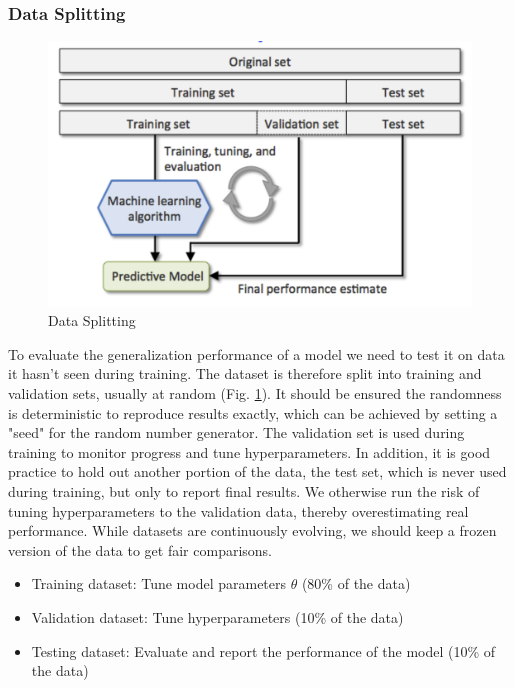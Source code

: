 \subsubsection{Data Splitting}
\begin{figure}[h]
    \includegraphics[width=\linewidth]{chapters/NLP/figures/data_splitting.png}
    \caption{Data Splitting}
    \label{fig:data_splitting}
\end{figure}
To evaluate the generalization performance of a model we need to test it on data it hasn't seen during training.
The dataset is therefore split into training and validation sets, usually at random (Fig. \ref{fig:data_splitting}).
It should be ensured the randomness is deterministic to reproduce results exactly, which can be achieved by setting a "seed" for the random number generator.
The validation set is used during training to monitor progress and tune hyperparameters.
In addition, it is good practice to hold out another portion of the data, the test set, which is never used during training, but only to report final results.
We otherwise run the risk of tuning hyperparameters to the validation data, thereby overestimating real performance.
While datasets are continuously evolving, we should keep a frozen version of the data to get fair comparisons.

\begin{itemize}
    \item Training dataset: Tune model parameters $\theta$ (80\% of the data)
    \item Validation dataset: Tune hyperparameters (10\% of the data)
    \item Testing dataset: Evaluate and report the performance of the model (10\% of the data)
\end{itemize}


